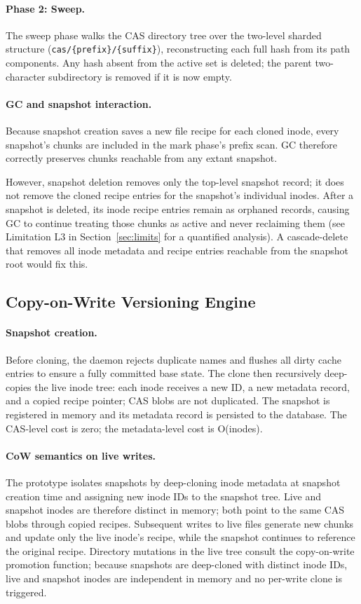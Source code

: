 \documentclass[5p,times]{elsarticle}
\begin{document}
\paragraph{Phase 2: Sweep.}
The sweep phase walks the CAS directory tree over the two-level sharded
structure (\texttt{cas/\{prefix\}/\{suffix\}}), reconstructing each full
hash from its path components.  Any hash absent from the active set is
deleted; the parent two-character subdirectory is removed if it is now
empty.

\paragraph{GC and snapshot interaction.}
Because snapshot creation saves a new file recipe for each cloned inode,
every snapshot's chunks are included in the mark phase's prefix scan.  GC therefore correctly
preserves chunks reachable from any extant snapshot.

However, snapshot deletion removes only the top-level snapshot record; it
does not remove the cloned recipe entries for the snapshot's individual
inodes.  After a snapshot is deleted, its inode recipe entries remain as
orphaned records, causing GC to continue treating those chunks as active
and never reclaiming them (see Limitation L3 in Section~\ref{sec:limits}
for a quantified analysis).  A cascade-delete that removes all inode
metadata and recipe entries reachable from the snapshot root would fix this.

\subsection{Copy-on-Write Versioning Engine}
\label{sec:cow}

\paragraph{Snapshot creation.}
Before cloning, the daemon rejects duplicate names and flushes all dirty
cache entries to ensure a fully committed base state.  The clone then
recursively deep-copies the live inode tree: each inode receives a new ID,
a new metadata record, and a copied recipe pointer; CAS blobs are not
duplicated.  The snapshot is registered in memory and its metadata record
is persisted to the database.  The CAS-level cost is zero; the
metadata-level cost is O(inodes).

\paragraph{CoW semantics on live writes.}
The prototype isolates snapshots by deep-cloning inode metadata at
snapshot creation time and assigning new inode IDs to the snapshot tree.
Live and snapshot inodes are therefore distinct in memory; both point to
the same CAS blobs through copied recipes.  Subsequent writes to live
files generate new chunks and update only the live inode's recipe, while
the snapshot continues to reference the original recipe.  Directory mutations in the live tree consult the copy-on-write promotion
function; because snapshots are deep-cloned with distinct inode IDs, live
and snapshot inodes are independent in memory and no per-write clone is
triggered.
\end{document}

